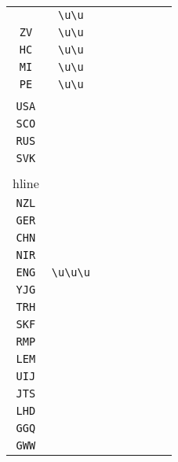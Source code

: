 \begin{longtable}{cccccccc}
\begin{tabular}{ll}
    \verb|LP| & \verb|\u\u|\\
\verb|ZV| & \verb|\u\u|\\
\verb|HC| & \verb|\u\u|\\
\verb|MI| & \verb|\u\u|\\
\verb|PE| & \verb|\u\u|
\end{tabular}
\\\midrule 
\begin{tabular}{l}
    \verb|PHI|\\
\verb|USA|\\
\verb|SCO|\\
\verb|RUS|\\
\verb|SVK|\\
\\hline\\
\verb|NZL|\\
\verb|GER|\\
\verb|CHN|\\
\verb|NIR|\\
\verb|ENG|
\end{tabular}

&
\verb|\u\u\u|
&

\begin{tabular}{l}
    \verb|\u\u\u|\\
\verb|YJG|\\
\verb|TRH|\\
\verb|SKF|\\
\verb|RMP|\\
\verb|LEM|
\end{tabular}

&

\begin{tabular}{l}
    \verb|\u\u\u|\\
\verb|UIJ|\\
\verb|JTS|\\
\verb|LHD|\\
\verb|GGQ|\\
\verb|GWW|
\end{tabular}

&


\end{longtable}
